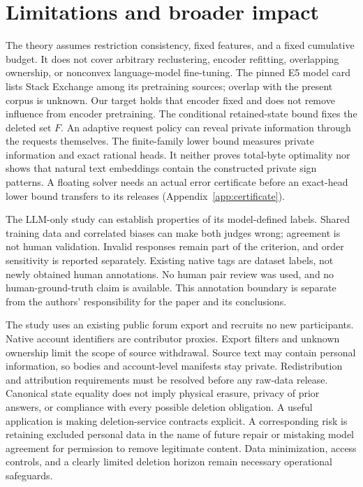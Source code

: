 \section{Limitations and broader impact}\label{sec:limits}
The theory assumes restriction consistency, fixed features, and a fixed
cumulative budget. It does not cover arbitrary reclustering, encoder
refitting, overlapping ownership, or nonconvex language-model fine-tuning.
The pinned E5 model card lists Stack Exchange among its pretraining
sources; overlap with the present corpus is unknown. Our target holds
that encoder fixed and does not remove influence from encoder pretraining.
The conditional retained-state bound fixes the deleted set $F$. An adaptive
request policy can reveal private information through the requests themselves.
The finite-family lower bound measures private information and exact
rational heads. It neither proves total-byte optimality nor shows that
natural text embeddings contain the constructed private sign patterns.
A floating solver needs an actual error certificate before an exact-head
lower bound transfers to its releases (Appendix~\ref{app:certificate}).

The LLM-only study can establish properties of its model-defined labels.
Shared training data and correlated biases can make both judges wrong;
agreement is not human validation. Invalid responses remain part of the
criterion, and order sensitivity is reported separately. Existing native
tags are dataset labels, not newly obtained human annotations. No human pair review was used, and no human-ground-truth claim is
available. This annotation boundary is separate from the authors' responsibility
for the paper and its conclusions.

The study uses an existing public forum export and recruits no new
participants. Native account identifiers are contributor proxies. Export filters and
unknown ownership limit the scope of source withdrawal. Source text may
contain personal information, so bodies and account-level manifests stay
private. Redistribution and attribution requirements must be resolved
before any raw-data release. Canonical state equality does not imply
physical erasure, privacy of prior answers, or compliance with every
possible deletion obligation. A useful application is making deletion-service
contracts explicit. A corresponding risk is retaining excluded personal data
in the name of future repair or mistaking model agreement for permission to
remove legitimate content. Data minimization, access controls, and a clearly
limited deletion horizon remain necessary operational safeguards.

